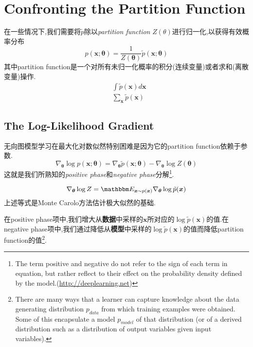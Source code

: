 \chapter{Confronting the Partition Function}\label{ch:partition_function}

在一些情况下,我们需要将$\tilde p$除以\textit{partition function} $Z(\theta)$进行归一化,以获得有效概率分布
\begin{equation}
p(\bm x;\bm\theta)=\frac{1}{Z(\bm\theta)}\tilde p(\bm x;\bm\theta)
\end{equation}
其中partition function是一个对所有未归一化概率的积分(连续变量)或者求和(离散变量)操作.
\begin{equation}\begin{split}
&\int\tilde p(\bm x)d\bm x\\
&\sum_{\bm x}\tilde p(\bm x)
\end{split}\end{equation}

\section{The Log-Likelihood Gradient}

无向图模型学习在最大化对数似然特别困难是因为它的partition function依赖于参数.
\begin{equation}
\nabla_{\bm\theta}\log p(\bm x;\bm\theta)=\nabla_{\bm\theta}\tilde p(\bm x;\bm\theta)-\nabla_{\bm\theta}\log Z(\bm\theta)
\end{equation}
这就是我们所熟知的\textit{positive phase}和\textit{negative phase}分解\footnote{The term positive and negative do not refer to the sign of each term in equation, but rather reflect to their effect on the probability density defined by the model.(\href{http://deeplearning.net/tutorial/rbm.html\#rbm}{http://deeplearning.net})}.

\begin{equation}\label{eq:gradient_of_log_partition_function}
\nabla_{\bm\theta}\log Z=\mathbbm E_{\bm x\sim p(\bm x)}\nabla_{\bm\theta}\log\tilde p(\bm x)
\end{equation}
上述等式是Monte Carolo方法估计极大似然的基础.

在positive phase项中,我们增大从\textbf{数据}中采样的$\bm x$所对应的$\log\tilde p(\bm x)$的值.在negative phase项中,我们通过降低从\textbf{模型}中采样的$\log\tilde p(\bm x)$的值而降低partition function的值\footnote{There are many ways that a learner can capture knowledge about the data generating distribution $p_{data}$ from which training examples were obtained. Some of this encapsulate a model $p_{model}$ of that distribution (or of a derived distribution such as a distribution of output variables given input variables).}.


